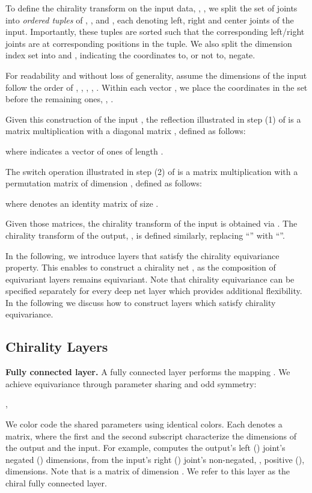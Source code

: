 \documentclass{article}
\begin{document}
To define the chirality transform on the input data, \ie, , we split the set of joints  into \emph{ordered tuples} of , , and , each denoting left, right and center joints of the input. 
Importantly, these tuples are sorted such that the corresponding left/right joints are at corresponding positions in the tuple.  We also split the dimension index set   into  and ,  indicating the coordinates to, or not to, negate.

For readability and without loss of generality, assume the dimensions of the input 
follow the order of , , , \ie,  . Within each vector , we place the coordinates in the set   before the remaining ones, \ie, . 

Given this construction of the input , the reflection illustrated in step (1) of  is a matrix multiplication with a  diagonal matrix , defined as follows:

where  indicates a vector of ones of length . 

The switch operation illustrated in step (2) of  is a matrix multiplication with a permutation matrix of dimension , defined as follows:

where  denotes an identity matrix of size . 

Given those matrices, the chirality transform of the input  is obtained via . The chirality transform of the output, , is defined similarly, replacing ``'' with ``''.

In the following, we  introduce layers that satisfy the  chirality equivariance property. This enables to construct a chirality net , as the composition of equivariant layers remains equivariant.  Note that  chirality equivariance can be specified separately for every deep net layer which provides additional flexibility. 
In the following we discuss how to construct  layers which satisfy chirality equivariance. 

\subsection{Chirality Layers}

\textbf{Fully connected layer.} 
A fully connected layer performs the mapping . 
We achieve equivariance through parameter sharing and odd symmetry:

,


We  color code the shared parameters using identical colors. Each  denotes a matrix, where the first and the second subscript characterize the dimensions of the output and the input. For example,  computes the output's left () joint's negated () dimensions, from the input's right () joint's non-negated, \ie, positive (), dimensions. Note that  is a matrix of dimension . We refer to this layer as the chiral fully connected layer. 
\end{document}
